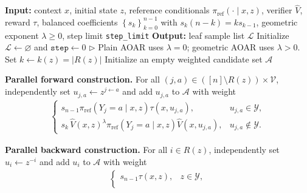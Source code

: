 \documentclass{article}
\numberwithin{theorem}{section}
\numberwithin{proposition}{section}
\numberwithin{corollary}{section}
\numberwithin{lemma}{section}
\numberwithin{conjecture}{section}
\numberwithin{remark}{section}
\numberwithin{definition}{section}
\numberwithin{assumption}{section}
\numberwithin{example}{section}
\newcommand{\calV}{{\mathcal{V}}}
\newcommand{\calY}{{\mathcal{Y}}}
\newcommand{\mbra}[1]{\left\{#1\right\}}
\newcommand{\abs}[1]{\left| #1\right|}
\providecommand{\base}{\pi_{\mathrm{ref}}}
\begin{document}
\iffalse
\begin{algorithm}[t]
\caption[AOAR-VGB sampler with depth coefficients, without a self-loop]{AOAR-VGB sampler with depth coefficients, without a self-loop
(\protect{} = parallelizable area)}
\label{alg:aoar_vgb_transition}
\begin{algorithmic}[1]
\Statex \textbf{Input:} context $x$, initial state $z$, reference conditionals $\base(\cdot\mid x,z)$, verifier $\widehat V$, reward $\tau$, balanced coefficients $\mbra{s_k}_{k=0}^{n-1}$ with $s_k(n-k)=ks_{k-1}$, geometric exponent $\lambda\ge0$, step limit \texttt{step\_limit}
\Statex \textbf{Output:} leaf sample list $\mathcal L$
\State Initialize $\mathcal L\gets\varnothing$ and $\texttt{step}\gets0$
\Statex \hspace{\algorithmicindent}$\triangleright$ Plain AOAR uses $\lambda=0$; geometric AOAR uses $\lambda>0$.
    \State Set $k\gets k(z)=\abs{R(z)}$
    \State Initialize an empty weighted candidate set $\mathcal A$
        \Statex \hspace*{\algorithmicindent}\colorbox{Lavender!25}{
        \parbox{0.88\linewidth}{
        \textbf{Parallel forward construction.}
        For all $(j,a)\in ([n]\setminus R(z))\times\calV$, independently set
        $u_{j,a}\gets z^{j\leftarrow a}$ and add $u_{j,a}$ to $\mathcal A$ with
        weight
        \begin{align*}
            \begin{cases}
                s_{n-1}\base(Y_j=a\mid x,z)\tau(x,u_{j,a}),
                    & u_{j,a}\in\calY,\\
                s_k\,\widehat V(x,z)^\lambda
                \base(Y_j=a\mid x,z)\widehat V(x,u_{j,a}),
                    & u_{j,a}\notin\calY.
            \end{cases}
        \end{align*}}}
    \EndIf
        \Statex \hspace*{\algorithmicindent}\colorbox{Lavender!25}{
        \parbox{0.88\linewidth}{
        \textbf{Parallel backward construction.}
        For all $i\in R(z)$, independently set $u_i\gets z^{-i}$ and add $u_i$ to
        $\mathcal A$ with weight
        \begin{align*}
            \begin{cases}
                s_{n-1}\tau(x,z), & z\in\calY,\\

\end{cases}
\end{align*}}}
\end{algorithmic}
\end{algorithm}
\end{document}

